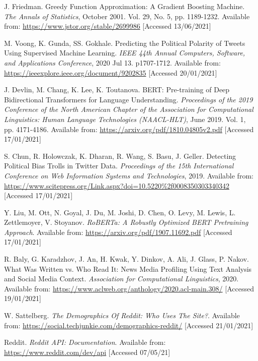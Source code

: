\begin{thebibliography}{9}
J. Friedman. Greedy Function Approximation: A Gradient Boosting Machine. \textit{The Annals of Statistics}, October 2001. Vol. 29, No. 5, pp. 1189-1232. Available from: \url{https://www.jstor.org/stable/2699986} [Accessed 13/06/2021]

M. Voong, K. Gunda, SS. Gokhale. Predicting the Political Polarity of Tweets Using Supervised Machine Learning. \textit{IEEE 44th Annual Computers, Software, and Applications Conference}, 2020 Jul 13. p1707-1712. Available from: \url{https://ieeexplore.ieee.org/document/9202835} [Accessed 20/01/2021]

J. Devlin, M. Chang, K. Lee, K. Toutanova. BERT: Pre-training of Deep Bidirectional Transformers for Language Understanding. \textit{Proceedings of the 2019 Conference of the North American Chapter of the Association for Computational Linguistics: Human Language Technologies (NAACL-HLT)}, June 2019. Vol. 1, pp. 4171-4186. Available from: \url{https://arxiv.org/pdf/1810.04805v2.pdf} [Accessed 17/01/2021]

S. Chun, R. Holowczak, K. Dharan, R. Wang, S. Basu, J. Geller. Detecting Political Bias Trolls in Twitter Data. \textit{Proceedings of the 15th International Conference on Web Information Systems and Technologies}, 2019. Available from: \url{https://www.scitepress.org/Link.aspx?doi=10.5220\%2f0008350303340342} [Accessed 17/01/2021]

Y. Liu, M. Ott, N. Goyal, J. Du, M. Joshi, D. Chen, O. Levy, M. Lewis, L. Zettlemoyer, V. Stoyanov. \textit{RoBERTa: A Robustly Optimized BERT Pretraining Approach}. Available from: \url{https://arxiv.org/pdf/1907.11692.pdf} [Accessed 17/01/2021]

R. Baly, G. Karadzhov, J. An, H. Kwak, Y. Dinkov, A. Ali, J. Glass, P. Nakov. What Was Written vs. Who Read It:
News Media Profiling Using Text Analysis and Social Media Context. \textit{Association for Computational Linguistics}, 2020. Available from: \url{https://www.aclweb.org/anthology/2020.acl-main.308/} [Accessed 19/01/2021]

W. Sattelberg. \textit{The Demographics Of Reddit: Who Uses The Site?}. Available from: \url{https://social.techjunkie.com/demographics-reddit/} [Accessed 21/01/2021]

Reddit. \textit{Reddit API: Documentation}. Available from: \url{https://www.reddit.com/dev/api} [Accessed 07/05/21]


\end{thebibliography}
